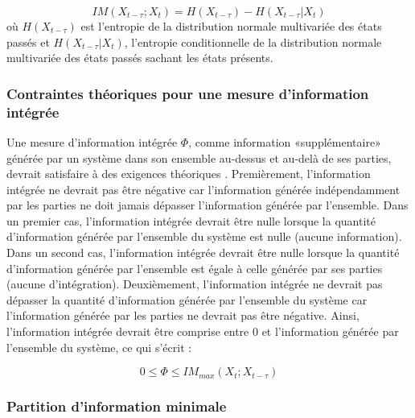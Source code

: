 \begin{equation}
IM(X_{t-\tau};X_t) = H(X_{t-\tau}) - H(X_{t-\tau}|X_t)
\end{equation}
où $H(X_{t-\tau})$ est l'entropie de la distribution normale multivariée des états passés et $H(X_{t-\tau}|X_t)$, l'entropie conditionnelle de la distribution normale multivariée des états passés sachant les états présents. 

\subsubsection{Contraintes théoriques pour une mesure d'information intégrée}
\label{requisitionstheoriques}

Une mesure d'information intégrée $\Phi$, comme information «supplémentaire» générée par un système dans son ensemble au-dessus et au-delà de ses parties, devrait satisfaire à des exigences théoriques \citep{oizumi2016measuring}. 
Premièrement, l'information intégrée ne devrait pas être négative car l'information générée indépendamment par les parties ne doit jamais dépasser l'information générée par l'ensemble. 
Dans un premier cas, l'information intégrée devrait être nulle lorsque la quantité d'information générée par l'ensemble du système est nulle (aucune information). 
Dans un second cas, l'information intégrée devrait être nulle lorsque la quantité d'information générée par l'ensemble est égale à celle générée par ses parties (aucune d'intégration). 
Deuxièmement, l'information intégrée ne devrait pas dépasser la quantité d'information générée par l'ensemble du système car l'information générée par les parties ne devrait pas être négative. 
Ainsi, l'information intégrée devrait être comprise entre 0 et l'information générée par l'ensemble du système, ce qui s'écrit :

\begin{equation}
0 \leq \Phi \leq IM_{max}(X_t;X_{t-\tau})
\end{equation} 

\subsubsection{Partition d'information minimale}
\label{partitioninfominimaletheorique}

